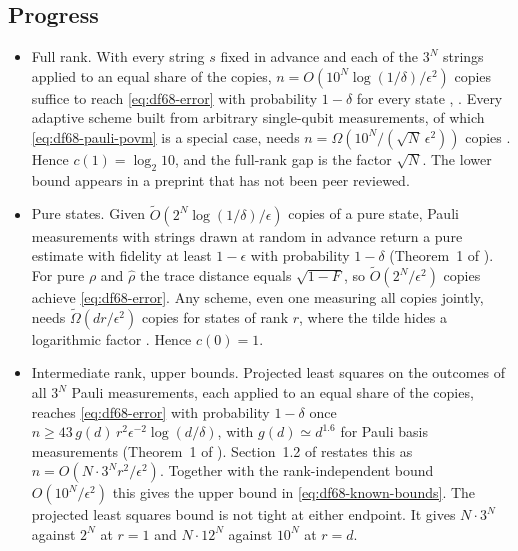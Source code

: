 \subsection*{Progress}

\begin{itemize}
  \item Full rank. With every string $s$ fixed in advance and each of the $3^N$ strings applied to an equal share of the copies, $n=O(10^N\log(1/\delta)/\epsilon^2)$ copies suffice to reach \eqref{eq:df68-error} with probability $1-\delta$ for every state , . Every adaptive scheme built from arbitrary single-qubit measurements, of which \eqref{eq:df68-pauli-povm} is a special case, needs $n=\Omega(10^N/(\sqrt N\,\epsilon^2))$ copies . Hence $c(1)=\log_2 10$, and the full-rank gap is the factor $\sqrt N$. The lower bound appears in a preprint that has not been peer reviewed.

  \item Pure states. Given $\tilde O(2^N\log(1/\delta)/\epsilon)$ copies of a pure state, Pauli measurements with strings drawn at random in advance return a pure estimate with fidelity at least $1-\epsilon$ with probability $1-\delta$ (Theorem~1 of ). For pure $\rho$ and $\hat\rho$ the trace distance equals $\sqrt{1-F}$, so $\tilde O(2^N/\epsilon^2)$ copies achieve \eqref{eq:df68-error}. Any scheme, even one measuring all copies jointly, needs $\tilde\Omega(dr/\epsilon^2)$ copies for states of rank $r$, where the tilde hides a logarithmic factor . Hence $c(0)=1$.

  \item Intermediate rank, upper bounds. Projected least squares on the outcomes of all $3^N$ Pauli measurements, each applied to an equal share of the copies, reaches \eqref{eq:df68-error} with probability $1-\delta$ once $n\geq 43\,g(d)\,r^2\epsilon^{-2}\log(d/\delta)$, with $g(d)\simeq d^{1.6}$ for Pauli basis measurements (Theorem~1 of ). Section~1.2 of  restates this as $n=O(N\cdot 3^N r^2/\epsilon^2)$. Together with the rank-independent bound $O(10^N/\epsilon^2)$ this gives the upper bound in \eqref{eq:df68-known-bounds}. The projected least squares bound is not tight at either endpoint. It gives $N\cdot 3^N$ against $2^N$ at $r=1$ and $N\cdot 12^N$ against $10^N$ at $r=d$.


\end{itemize}
